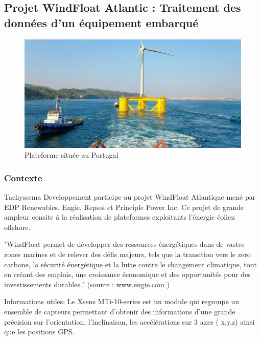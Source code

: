 \subsection{Projet WindFloat Atlantic : Traitement des données d'un équipement embarqué}

\begin{figure}[ht]
    \centering
    \includegraphics[scale=0.15]{img/WindFloatProject.jpeg}
    \caption{Plateforme située au Portugal}
    \label{fig:CameraCmdsettings}
\end{figure}

\subsubsection{Contexte}

Tachyssema Developpement participe au projet WindFloat Atlantique mené par EDP Renewables, Engie, Repsol et Principle Power Inc. Ce projet de grande ampleur consite à la réalisation de plateformes exploitants l'énergie éolien offshore.

"WindFloat permet de développer des ressources énergétiques dans de vastes zones marines et de relever des défis majeurs, tels que la transition vers le zero carbone, la sécurité énergétique et la lutte contre le changement climatique, tout en créant des emplois, une croissance économique et des opportunités pour des investissements durables." (source : www.engie.com )

Informations utiles: Le Xsens MTi-10-series est un module qui regroupe un ensemble de capteurs permettant d'obtenir des informations d'une grande précision sur l'orientation, l'inclinaison, les accélérations sur 3 axes ( x,y,z) ainsi que les positions GPS. 
\newline

